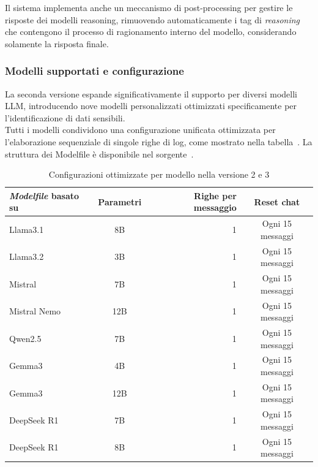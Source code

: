 \documentclass[12pt,twoside]{report}
\begin{document}
Il sistema implementa anche un meccanismo di post-processing per gestire le risposte dei modelli reasoning, rimuovendo automaticamente i tag di \textit{reasoning} che contengono il processo di ragionamento interno del modello, considerando solamente la risposta finale.

\subsubsection{Modelli supportati e configurazione}
\label{subsubsec:ver2_modelli_supportati}

La seconda versione espande significativamente il supporto per diversi modelli LLM, introducendo nove modelli personalizzati ottimizzati specificamente per l'identificazione di dati sensibili.\\
Tutti i modelli condividono una configurazione unificata ottimizzata per l'elaborazione sequenziale di singole righe di log, come mostrato nella tabella~. La struttura dei Modelfile è disponibile nel sorgente~.

\begin{table}[h!]
    \centering
    \begin{tabular}{|l|c|r|c|}
        \hline
        \textbf{\textit{Modelfile} basato su} & \textbf{Parametri} & \textbf{Righe per messaggio} & \textbf{Reset chat} \\ \hline
        Llama3.1                              & 8B                 & 1                            & Ogni 15 messaggi    \\ \hline
        Llama3.2                              & 3B                 & 1                            & Ogni 15 messaggi    \\ \hline
        Mistral                               & 7B                 & 1                            & Ogni 15 messaggi    \\ \hline
        Mistral Nemo                          & 12B                & 1                            & Ogni 15 messaggi    \\ \hline
        Qwen2.5                               & 7B                 & 1                            & Ogni 15 messaggi    \\ \hline
        Gemma3                                & 4B                 & 1                            & Ogni 15 messaggi    \\ \hline
        Gemma3                                & 12B                & 1                            & Ogni 15 messaggi    \\ \hline
        DeepSeek R1                           & 7B                 & 1                            & Ogni 15 messaggi    \\ \hline
        DeepSeek R1                           & 8B                 & 1                            & Ogni 15 messaggi    \\ \hline
    \end{tabular}
    \caption{Configurazioni ottimizzate per modello nella versione 2 e 3}
    \label{tab:modelli_llm_ver2}
\end{table}
\end{document}
